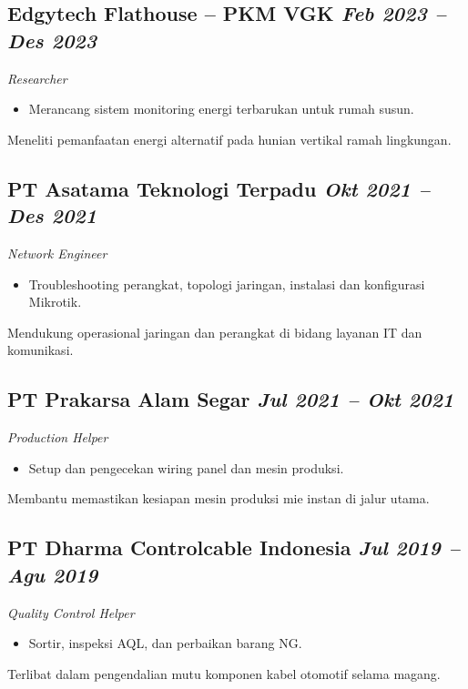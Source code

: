 \documentclass[a4paper,11pt]{article}
\begin{document}
	\subsection*{Edgytech Flathouse – PKM VGK \hfill \textnormal{\textit{Feb 2023 – Des 2023}}}
	\textit{Researcher}
	\begin{itemize}
		\item Merancang sistem monitoring energi terbarukan untuk rumah susun.
	\end{itemize}
	\noindent Meneliti pemanfaatan energi alternatif pada hunian vertikal ramah lingkungan.\\
	
	\subsection*{PT Asatama Teknologi Terpadu \hfill \textnormal{\textit{Okt 2021 – Des 2021}}}
	\textit{Network Engineer}
	\begin{itemize}
		\item Troubleshooting perangkat, topologi jaringan, instalasi dan konfigurasi Mikrotik.
	\end{itemize}
	\noindent Mendukung operasional jaringan dan perangkat di bidang layanan IT dan komunikasi.\\
	
	\subsection*{PT Prakarsa Alam Segar \hfill \textnormal{\textit{Jul 2021 – Okt 2021}}}
	\textit{Production Helper}
	\begin{itemize}
		\item Setup dan pengecekan wiring panel dan mesin produksi.
	\end{itemize}
	\noindent Membantu memastikan kesiapan mesin produksi mie instan di jalur utama.\\
	
	\subsection*{PT Dharma Controlcable Indonesia \hfill \textnormal{\textit{Jul 2019 – Agu 2019}}}
	\textit{Quality Control Helper}
	\begin{itemize}
		\item Sortir, inspeksi AQL, dan perbaikan barang NG.
	\end{itemize}
	\noindent Terlibat dalam pengendalian mutu komponen kabel otomotif selama magang.\\
	
\end{document}
